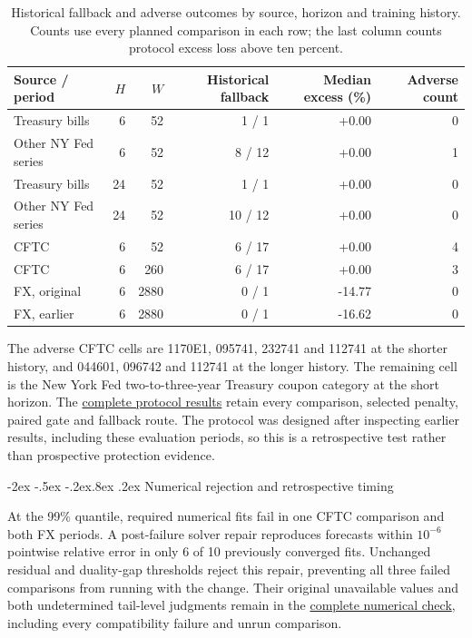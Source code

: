 \documentclass[10pt,a4paper]{article}
\makeatletter
\renewcommand\section{\@startsection{section}{1}{\z@}%
  {-2ex \@plus -.5ex \@minus -.2ex}{.8ex \@plus .2ex}%
  {\normalfont\large\bfseries}}
\makeatother
\begin{document}
\begin{table}[!htbp]\centering\footnotesize\setlength{\tabcolsep}{4pt}
\caption{Historical fallback and adverse outcomes by source, horizon and training history. Counts use every planned comparison in each row; the last column counts protocol excess loss above ten percent.}\label{tab:v13-routing}
\begin{tabular}{lrrr rr}\toprule
Source / period & $H$ & $W$ & Historical fallback & Median excess (\%) & Adverse count\\\midrule
Treasury bills & 6 & 52 & 1 / 1 & +0.00 & 0 \\
Other NY Fed series & 6 & 52 & 8 / 12 & +0.00 & 1 \\
Treasury bills & 24 & 52 & 1 / 1 & +0.00 & 0 \\
Other NY Fed series & 24 & 52 & 10 / 12 & +0.00 & 0 \\
CFTC & 6 & 52 & 6 / 17 & +0.00 & 4 \\
CFTC & 6 & 260 & 6 / 17 & +0.00 & 3 \\
FX, original & 6 & 2880 & 0 / 1 & -14.77 & 0 \\
FX, earlier & 6 & 2880 & 0 / 1 & -16.62 & 0 \\
\bottomrule\end{tabular}
\end{table}

The adverse CFTC cells are 1170E1, 095741, 232741 and 112741 at the shorter history, and 044601, 096742 and 112741 at the longer history. The remaining cell is the New York Fed two-to-three-year Treasury coupon category at the short horizon. The \href{https://github.com/ByronLi0207/financial-mathematics-paper-20261020/tree/revision-v13/results/v13/recommended-protocol}{complete protocol results} retain every comparison, selected penalty, paired gate and fallback route. The protocol was designed after inspecting earlier results, including these evaluation periods, so this is a retrospective test rather than prospective protection evidence.

\FloatBarrier


\section{Numerical rejection and retrospective timing}\label{sup:wp5}\label{sup:reproduction}\label{sup:v12-details}

At the 99\% quantile, required numerical fits fail in one CFTC comparison and both FX periods. A post-failure solver repair reproduces forecasts within $10^{-6}$ pointwise relative error in only 6 of 10 previously converged fits. Unchanged residual and duality-gap thresholds reject this repair, preventing all three failed comparisons from running with the change. Their original unavailable values and both undetermined tail-level judgments remain in the \href{https://github.com/ByronLi0207/financial-mathematics-paper-20261020/tree/revision-v13/results/v13/tau-repair}{complete numerical check}, including every compatibility failure and unrun comparison.
\end{document}
